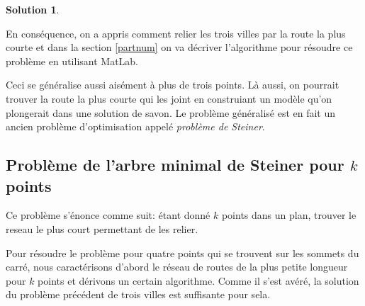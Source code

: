 \documentclass[10pt,a4paper]{article}%
\theoremstyle{theorem}
\theoremstyle{definition}
\newtheorem*{solution*}{Solution}
\begin{document}
\begin{solution*}
	        \begin{figure}[h]
	        	\begin{center}
	        \end{center}   
        	\caption{}\label{pointF4}
	        \end{figure}
        \end{solution*} 
	        
	        
	        En conséquence, on a appris comment relier les trois villes par la route la plus courte et dans la section \ref{partnum} on va décriver l'algorithme pour résoudre ce problème en utilisant MatLab. 
	        
	        Ceci se généralise aussi aisément à plus de trois points. Là aussi, on pourrait trouver la route la plus courte qui les joint en construiant un modèle qu'on plongerait dans une solution de savon. Le problème généralisé est en fait un ancien problème d'optimisation appelé \textit{problème de Steiner}.
	        
		\subsection{Problème de l'arbre minimal de Steiner pour $k$ points}
		
			Ce problème s'énonce comme suit: étant donné $k$ points dans un plan, trouver le reseau le plus court permettant de les relier.
			
			Pour résoudre le problème pour quatre points qui se trouvent sur les sommets du carré, nous caractérisons d'abord le réseau de routes de la plus petite longueur pour $k$ points et dérivons un certain algorithme. Comme il s'est avéré, la solution du problème précédent de trois villes est suffisante pour sela. 
			
\end{document}
